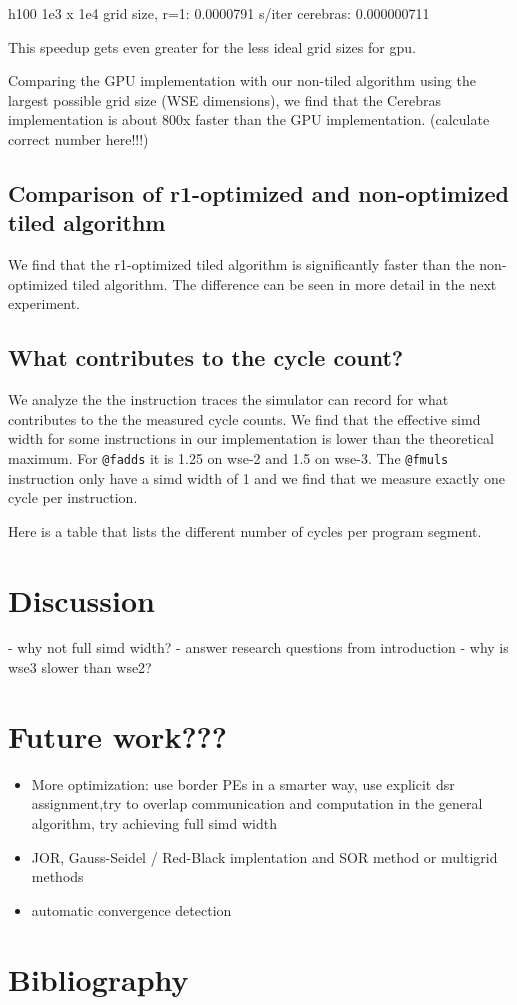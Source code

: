 \documentclass{article}
\begin{document}
h100 1e3 x 1e4 grid size, r=1: 0.0000791 s/iter
cerebras: 0.000000711


This speedup gets even greater for the less ideal grid sizes for gpu.

Comparing the GPU implementation with our non-tiled algorithm using the largest possible grid size (WSE dimensions), we find that the Cerebras implementation is about 800x faster than the GPU implementation. (calculate correct number here!!!)


\subsection{Comparison of r1-optimized and non-optimized tiled algorithm}
We find that the r1-optimized tiled algorithm is significantly faster than the non-optimized tiled algorithm.
The difference can be seen in more detail in the next experiment.

\subsection{What contributes to the cycle count?}
We analyze the the instruction traces the simulator can record for what contributes to the the measured cycle counts.
We find that the effective simd width for some instructions in our implementation is lower than the theoretical maximum.
For \texttt{@fadds} it is 1.25 on wse-2 and 1.5 on wse-3.
The \texttt{@fmuls} instruction only have a simd width of 1 and we find that we measure exactly one cycle per instruction.

Here is a table that lists the different number of cycles per program segment.


\section{Discussion}
- why not full simd width?
- answer research questions from introduction
- why is wse3 slower than wse2?

\section{Future work???}
\begin{itemize}
    \item More optimization: use border PEs in a smarter way, use explicit dsr assignment,try to overlap communication and computation in the general algorithm, try achieving full simd width
    \item JOR, Gauss-Seidel / Red-Black implentation and SOR method or multigrid methods
    \item automatic convergence detection
\end{itemize}

\section{Bibliography}
\end{document}
